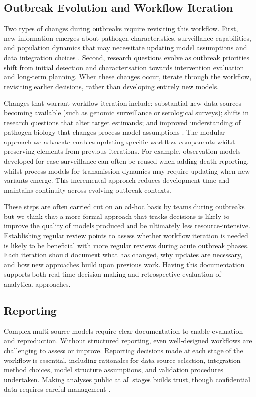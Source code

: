 \documentclass{article}
\begin{document}
\subsection{Outbreak Evolution and Workflow Iteration}  \label{sec:outbreak}
Two types of changes during outbreaks require revisiting this workflow.
First, new information emerges about pathogen characteristics, surveillance capabilities, and population dynamics that may necessitate updating model assumptions and data integration choices \citep{mccaw2023role}.
Second, research questions evolve as outbreak priorities shift from initial detection and characterisation towards intervention evaluation and long-term planning.
When these changes occur, iterate through the workflow, revisiting earlier decisions, rather than developing entirely new models.

Changes that warrant workflow iteration include: substantial new data sources becoming available (such as genomic surveillance or serological surveys); shifts in research questions that alter target estimands; and improved understanding of pathogen biology that changes process model assumptions \citep{knock2021key}.
The modular approach we advocate enables updating specific workflow components whilst preserving elements from previous iterations.
For example, observation models developed for case surveillance can often be reused when adding death reporting, whilst process models for transmission dynamics may require updating when new variants emerge.
This incremental approach reduces development time and maintains continuity across evolving outbreak contexts.

These steps are often carried out on an ad-hoc basis by teams during outbreaks but we think that a more formal approach that tracks decisions is likely to improve the quality of models produced and be ultimately less resource-intensive.
Establishing regular review points to assess whether workflow iteration is needed is likely to be beneficial with more regular reviews during acute outbreak phases.
Each iteration should document what has changed, why updates are necessary, and how new approaches build upon previous work.
Having this documentation supports both real-time decision-making and retrospective evaluation of analytical approaches.

\subsection{Reporting} \label{sec:reporting}
Complex multi-source models require clear documentation to enable evaluation and reproduction.
Without structured reporting, even well-designed workflows are challenging to assess or improve.
Reporting decisions made at each stage of the workflow is essential, including rationales for data source selection, integration method choices, model structure assumptions, and validation procedures undertaken.
Making analyses public at all stages builds trust, though confidential data requires careful management \citep{Abbott2021-delta, Abbott2022-prevalence}.
\end{document}
